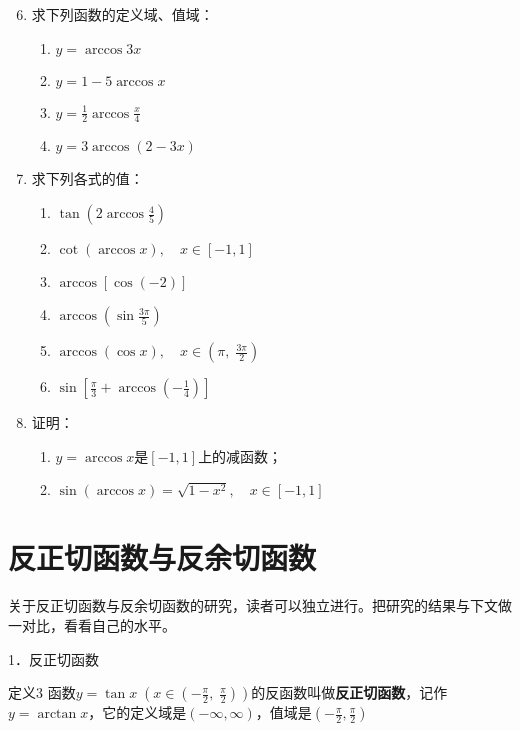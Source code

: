 \begin{enumerate}\setcounter{enumi}{5}
    \item 求下列函数的定义域、值域：
\begin{multicols}{2}
\begin{enumerate}[(1)]
    \item $y=\arccos 3x$
    \item $y=1-5\arccos x$
    \item $y=\frac{1}{2}\arccos\frac{x}{4}$
    \item $y=3\arccos (2-3x)$
\end{enumerate}
\end{multicols}

\item 求下列各式的值：
\begin{multicols}{2}
\begin{enumerate}[(1)]
    \item $\tan\left(2\arccos\frac{4}{5}\right)$
    \item $\cot(\arccos x),\quad x\in[-1,1]$
    \item $\arccos[\cos(-2)]$
    \item $\arccos\left(\sin\frac{3\pi}{5}\right)$
    \item $\arccos(\cos x),\quad x\in\left(\pi,\; \frac{3\pi}{2}\right)$
    \item $\sin\left[\frac{\pi}{3}+\arccos\left(-\frac{1}{4}\right)\right]$
\end{enumerate}
\end{multicols}

\item 证明：
\begin{enumerate}[(1)]
    \item $y=\arccos x$是$[-1,1]$上的减函数；
    \item $\sin(\arccos x)=\sqrt{1-x^2},\quad x\in[-1,1]$
\end{enumerate}
\end{enumerate}

\section{反正切函数与反余切函数}
关于反正切函数与反余切函数的研究，读者可以独立进行。把研究的结果与下文做一对比，看看自己的水平。

1．反正切函数

\begin{thm}
 {定义3} 函数$y=\tan x\; \left(x\in \left(-\frac{\pi}{2},\; \frac{\pi}{2}\right) \right)$的反函数叫做\textbf{反正切函数}，记作$y=\arctan x$，它的定义域是$(-\infty,\infty)$，值域是$\left(-\frac{\pi}{2},\frac{\pi}{2}\right)$
\end{thm}


